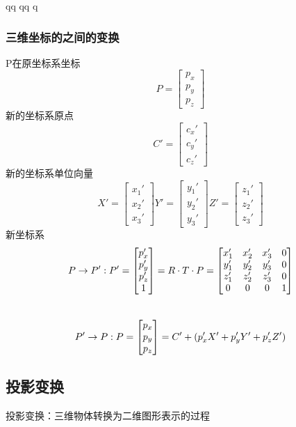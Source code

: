 qq	qq	q                                                                                                                                                                                                                                                                                      \documentclass{article}
\begin{document}
\begin{CJK}{UTF8}{gbsn}
	\subsubsection{三维坐标的之间的变换}
	P在原坐标系坐标\\
	$$
	P=\begin{bmatrix}
	p_x\\p_y\\p_z
	\end{bmatrix}
	$$
	新的坐标系原点\\
	$$
	C'=\begin{bmatrix}
	c_x'\\c_y'\\c_z'
	\end{bmatrix}
	$$
	新的坐标系单位向量\\
	$$
	X'=\begin{bmatrix}
	x_1'\\x_2'\\x_3'
	\end{bmatrix}
	Y'=\begin{bmatrix}
	y_1'\\y_2'\\y_3'
	\end{bmatrix}
	Z'=\begin{bmatrix}
	z_1'\\z_2'\\z_3'
	\end{bmatrix}
	$$
	新坐标系\\
	$$
	P\rightarrow P':\\
	P'=\begin{bmatrix}
	p_x'\\p_y'\\p_z'\\1
	\end{bmatrix}=R\cdot T\cdot P\\
	=\begin{bmatrix}
	x_1'&x_2'&x_3'&0\\
	y_1'&y_2'&y_3'&0\\
	z_1'&z_2'&z_3'&0\\
	0&0&0&1
	\end{bmatrix}
	$$
	\\
	$$
	P'\rightarrow P:\\
	P=\begin{bmatrix}
	p_x\\p_y\\p_z
	\end{bmatrix}=C'+(p_x'X'+p_y'Y'+p_z'Z')\\
	$$
	\subsection{投影变换}
	投影变换：三维物体转换为二维图形表示的过程\\

\end{CJK}
\end{document}
